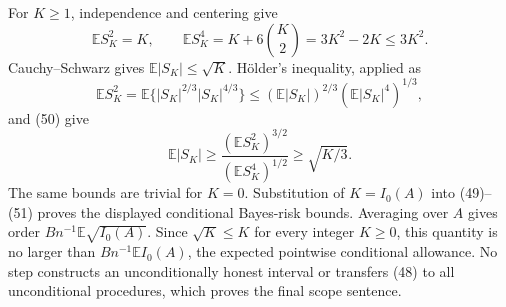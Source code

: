 For \(K\ge1\), independence and centering give
\[
 \mathbb E S_K^2=K,
 \qquad
 \mathbb E S_K^4=K+6{K\choose2}=3K^2-2K\le3K^2.
\tag{50}
\]
Cauchy--Schwarz gives \(\mathbb E|S_K|\le\sqrt K\).  Hölder's inequality, applied as
\[
 \mathbb E S_K^2
 =\mathbb E\{|S_K|^{2/3}|S_K|^{4/3}\}
 \le(\mathbb E|S_K|)^{2/3}(\mathbb E|S_K|^4)^{1/3},
\]
and (50) give
\[
 \mathbb E|S_K|
 \ge\frac{(\mathbb E S_K^2)^{3/2}}{(\mathbb E S_K^4)^{1/2}}
 \ge\sqrt{K/3}.
\tag{51}
\]
The same bounds are trivial for \(K=0\).  Substitution of \(K=I_0(A)\) into (49)--(51) proves the displayed conditional Bayes-risk bounds.  Averaging over \(A\) gives order \(Bn^{-1}\mathbb E\sqrt{I_0(A)}\).  Since \(\sqrt K\le K\) for every integer \(K\ge0\), this quantity is no larger than \(Bn^{-1}\mathbb EI_0(A)\), the expected pointwise conditional allowance.  No step constructs an unconditionally honest interval or transfers (48) to all unconditional procedures, which proves the final scope sentence.